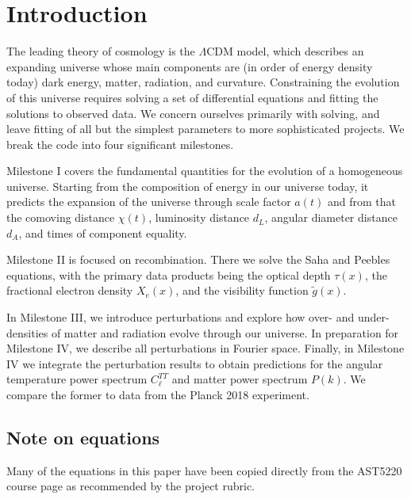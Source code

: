 \documentclass[aps,prl,twocolumn,groupedaddress,nofootinbib]{revtex4-2}
\begin{document}

\maketitle

\section{Introduction}
The leading theory of cosmology is the $\Lambda$CDM model, which describes an expanding universe whose main components are (in order of energy density today) dark energy, matter, radiation, and curvature. Constraining the evolution of this universe requires solving a set of differential equations and fitting the solutions to observed data. We concern ourselves primarily with solving, and leave fitting of all but the simplest parameters to more sophisticated projects. We break the code into four significant milestones.

Milestone I covers the fundamental quantities for the evolution of a homogeneous universe. Starting from the composition of energy in our universe today, it predicts the expansion of the universe through scale factor $a(t)$ and from that the comoving distance $\chi(t)$, luminosity distance $d_L$, angular diameter distance $d_A$, and times of component equality.

Milestone II is focused on recombination. There we solve the Saha and Peebles equations, with the primary data products being the optical depth $\tau(x)$, the fractional electron density $X_e(x)$, and the visibility function $\tilde{g}(x)$.

In Milestone III, we introduce perturbations and explore how over- and under-densities of matter and radiation evolve through our universe. In preparation for Milestone IV, we describe all perturbations in Fourier space. Finally, in Milestone IV we integrate the perturbation results to obtain predictions for the angular temperature power spectrum $C_\ell^{TT}$ and matter power spectrum $P(k)$. We compare the former to data from the Planck 2018 experiment.
\subsection{Note on equations}
Many of the equations in this paper have been copied directly from the AST5220 course page \cite{winther} as recommended by the project rubric.
\end{document}
